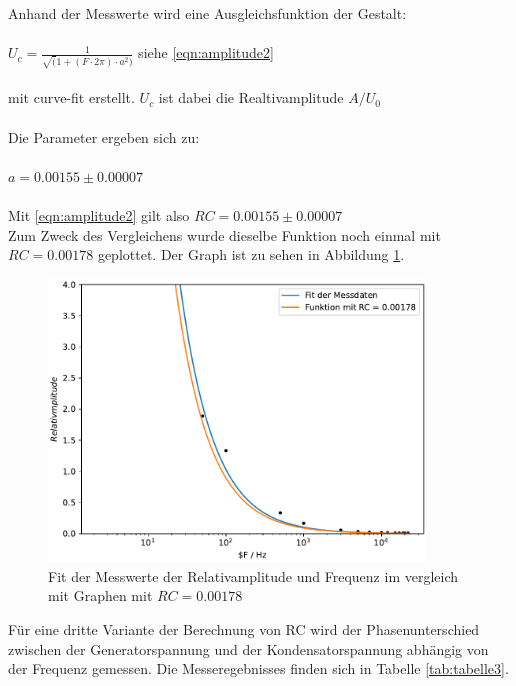 \newpage

Anhand der Messwerte wird eine Ausgleichsfunktion der Gestalt:\\
\\
$U_c = \frac{1}{\sqrt(1+(F\cdot2\pi)\cdot a^2)}$ siehe \ref{eqn:amplitude2}\\
\\
mit curve-fit \cite{scipy} erstellt. $U_c$ ist dabei die Realtivamplitude $A/U_0$\\
\\
Die Parameter ergeben sich zu:\\
\\
$a = 0.00155 \pm 0.00007$\\
\\
Mit \ref{eqn:amplitude2} gilt also $RC = 0.00155 \pm 0.00007 $\\

Zum Zweck des Vergleichens wurde dieselbe Funktion noch einmal mit $RC = 0.00178$ geplottet. Der Graph ist zu sehen in Abbildung \ref{fig:plot2}.

\begin{figure}
  \centering
  \includegraphics[width = 10cm]{plot2.pdf}
  \caption{Fit der Messwerte der Relativamplitude und Frequenz im vergleich mit Graphen mit $RC = 0.00178$}
  \label{fig:plot2}
\end{figure}

\newpage





Für eine dritte Variante der Berechnung von RC wird der Phasenunterschied zwischen der Generatorspannung und der Kondensatorspannung abhängig von der Frequenz gemessen.
Die Messeregebnisses finden sich in Tabelle \ref{tab:tabelle3}.

